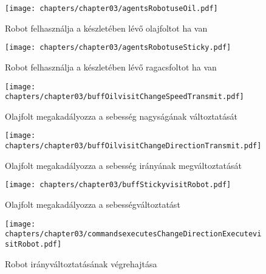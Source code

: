 \begin{itemize}
\begin{figure}[h]
	\begin{center}
		\texttt{[image: chapters/chapter03/agentsRobotuseOil.pdf]}
		\caption{Robot felhasználja a készletében lévő olajfoltot ha van}
		\label{fig:agents.Robot.useOil}
	\end{center}
\end{figure}

\begin{figure}[h]
	\begin{center}
		\texttt{[image: chapters/chapter03/agentsRobotuseSticky.pdf]}
		\caption{Robot felhasználja a készletében lévő ragacsfoltot ha van}
		\label{fig:agents.Robot.useSticky}
	\end{center}
\end{figure}

\begin{figure}[h]
	\begin{center}
		\texttt{[image: chapters/chapter03/buffOilvisitChangeSpeedTransmit.pdf]}
		\caption{Olajfolt megakadályozza a sebesség nagyságának változtatását}
		\label{fig:buff.Oil.visit}
	\end{center}
\end{figure}

\begin{figure}[h]
	\begin{center}
		\texttt{[image: chapters/chapter03/buffOilvisitChangeDirectionTransmit.pdf]}
		\caption{Olajfolt megakadályozza a sebesség irányának megváltoztatását}
		\label{fig:buff.Oil.visit2}
	\end{center}
\end{figure}

\begin{figure}[h]
	\begin{center}
		\texttt{[image: chapters/chapter03/buffStickyvisitRobot.pdf]}
		\caption{Olajfolt megakadályozza a sebességváltoztatást}
		\label{fig:buff.Sticky.visit}
	\end{center}
\end{figure}

\begin{figure}[h]
	\begin{center}
		\texttt{[image: chapters/chapter03/commandsexecutesChangeDirectionExecutevisitRobot.pdf]}
		\caption{Robot irányváltoztatásának végrehajtása}
		\label{fig:command.executes.ChangeDirectionExecute.visit}
	\end{center}
\end{figure}


\end{itemize}

